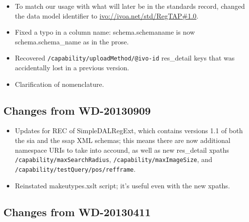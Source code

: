 \documentclass[11pt,a4paper]{ivoa}
\begin{document}
\begin{itemize}

\item To match our usage with what will later be in the standards
  record, changed the data model identifier to
  \url{ivo://ivoa.net/std/RegTAP\#1.0}.

\item Fixed a typo in a column name: schema.schemaname is now schema.schema\_name
  as in the prose.{}

\item Recovered
  \texttt{/capability/uploadMethod/@ivo-id} res\_detail keys that was
  accidentally lost in a previous version.{}

\item Clarification of nomenclature.{}

\end{itemize}

\subsection{Changes from WD-20130909}

\label{changes-20130909}


\begin{itemize}

\item Updates for REC of SimpleDALRegExt, which contains versions 1.1 of
  both the sia and the ssap XML schemas; this means there are now additional
  namespace URIs to take into accound, as well as new res\_detail xpaths
  \texttt{/capability/maxSearchRadius},
  \texttt{/capability/maxImageSize}, and
  \texttt{/capability/testQuery/pos/refframe}.{}

\item Reinstated makeutypes.xslt script; it's useful even with the new
  xpaths.{}

\end{itemize}

\subsection{Changes from WD-20130411}

\label{changes-20130411}
\end{document}
